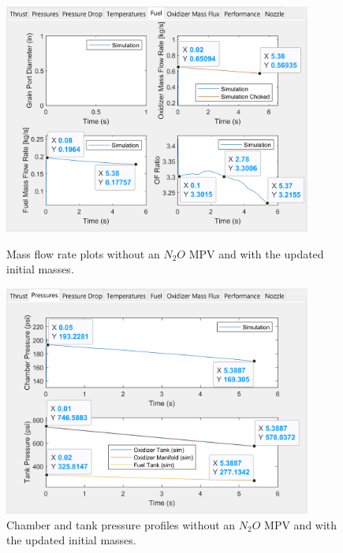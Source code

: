 \documentclass[9pt]{article} %
\numberwithin{equation}{section} %
\begin{document}
\begin{figure}
    \centering
    \begin{minipage}{0.49\textwidth}
        \centering
        \includegraphics[scale=0.5, width=0.9\textwidth, trim={0cm 0cm 0cm 0cm}, clip]{system_sim_files/stanford_final_fuel.png} %
        \caption{Mass flow rate plots without an $N_{2}O$ MPV and with the updated initial masses.}
        \label{fig:stanford_final_thrust}
    \end{minipage}\hfill
    \begin{minipage}{0.49\textwidth}
        \centering
        \includegraphics[scale=0.5, width=0.9\textwidth, trim={0cm 0cm 0cm 0cm}, clip]{system_sim_files/stanford_final_pressures.png} %
        \caption{Chamber and tank pressure profiles without an $N_{2}O$ MPV and with the updated initial masses.}
        \label{fig:stanford_final_pressures}
    \end{minipage}
\end{figure} 
\end{document}
